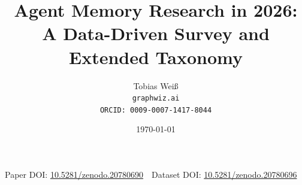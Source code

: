 \documentclass[11pt,a4paper]{article}
\title{
  \vspace{-2em}
  \textbf{Agent Memory Research in 2026:\\ A Data-Driven Survey and Extended Taxonomy}
}
\author{
  Tobias Wei{\ss}\\
  \texttt{graphwiz.ai}\\
  \texttt{ORCID: 0009-0007-1417-8044}
}
\date{\today}
\newcommand{\paperdoi}{10.5281/zenodo.20780690}
\newcommand{\datasetdoi}{10.5281/zenodo.20780696}
\begin{document}
\maketitle

\vspace{-1em}
\noindent\small\textsf{Paper DOI: \href{https://doi.org/\paperdoi}{\paperdoi}$\quad$Dataset DOI: \href{https://doi.org/\datasetdoi}{\datasetdoi}}






















\newpage
\begin{appendix}



\end{appendix}
\end{document}
